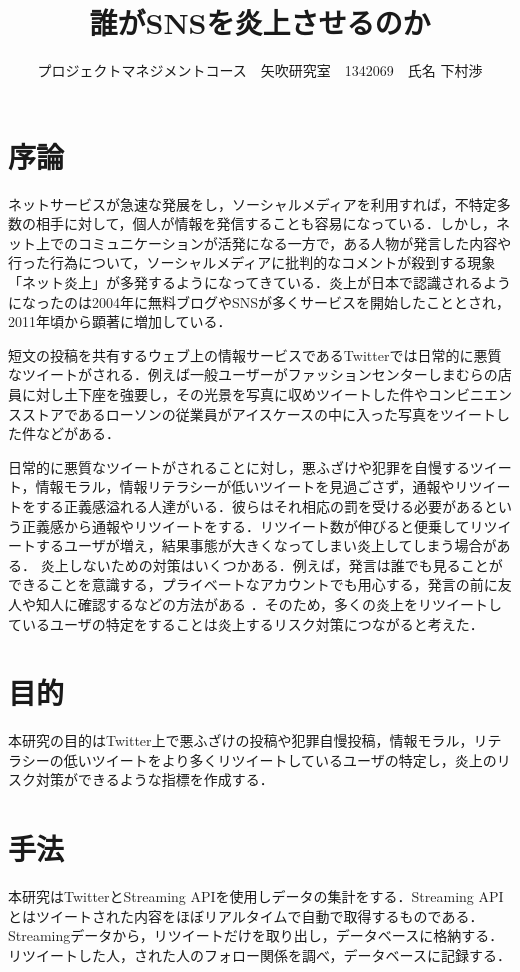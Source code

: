\documentclass[uplatex,twocolumn,dvipdfmx]{jsarticle}
\title{\vspace{-5mm}\fontsize{14pt}{0pt}\selectfont 誰がSNSを炎上させるのか}
\author{\normalsize プロジェクトマネジメントコース　矢吹研究室　1342069　氏名 下村渉}
\date{}
\begin{document}
\fontsize{10.5pt}{\baselineskip}\selectfont
\maketitle





\section{序論}
ネットサービスが急速な発展をし，ソーシャルメディアを利用すれば，不特定多数の相手に対して，個人が情報を発信することも容易になっている．しかし，ネット上でのコミュニケーションが活発になる一方で，ある人物が発言した内容や行った行為について，ソーシャルメディアに批判的なコメントが殺到する現象「ネット炎上」が多発するようになってきている\cite{a}．炎上が日本で認識されるようになったのは2004年に無料ブログやSNSが多くサービスを開始したこととされ，2011年頃から顕著に増加している\cite{b}．

 短文の投稿を共有するウェブ上の情報サービスであるTwitterでは日常的に悪質なツイートがされる．例えば一般ユーザーがファッションセンターしまむらの店員に対し土下座を強要し，その光景を写真に収めツイートした件やコンビニエンスストアであるローソンの従業員がアイスケースの中に入った写真をツイートした件などがある．

日常的に悪質なツイートがされることに対し，悪ふざけや犯罪を自慢するツイート，情報モラル，情報リテラシーが低いツイートを見過ごさず，通報やリツイートをする正義感溢れる人達がいる．彼らはそれ相応の罰を受ける必要があるという正義感から通報やリツイートをする．リツイート数が伸びると便乗してリツイートするユーザが増え，結果事態が大きくなってしまい炎上してしまう場合がある．
 炎上しないための対策はいくつかある．例えば，発言は誰でも見ることができることを意識する，プライベートなアカウントでも用心する，発言の前に友人や知人に確認するなどの方法がある ．そのため，多くの炎上をリツイートしているユーザの特定をすることは炎上するリスク対策につながると考えた．



\noindent




\section{目的}
本研究の目的はTwitter上で悪ふざけの投稿や犯罪自慢投稿，情報モラル，リテラシーの低いツイートをより多くリツイートしているユーザの特定し，炎上のリスク対策ができるような指標を作成する．
\section{手法}
本研究はTwitterとStreaming APIを使用しデータの集計をする．Streaming APIとはツイートされた内容をほぼリアルタイムで自動で取得するものである．Streamingデータから，リツイートだけを取り出し，データベースに格納する．リツイートした人，された人のフォロー関係を調べ，データベースに記録する．
\end{document}
